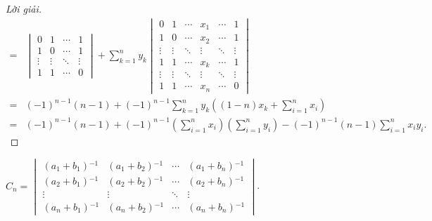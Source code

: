 \documentclass[class=nhvh-linear-algebra,crop=false]{standalone}
\begin{document}
\begin{proof}[Lời giải]
\begin{align*}
        = &
        \begin{vmatrix}
            0      & 1      & \cdots & 1      \\
            1      & 0      & \cdots & 1      \\
            \vdots & \vdots & \ddots & \vdots \\
            1      & 1      & \cdots & 0
        \end{vmatrix}
        +
        \sum^{n}_{k=1}y_{k}
        \begin{vmatrix}
            0      & 1      & \cdots & x_{1}  & \cdots & 1      \\
            1      & 0      & \cdots & x_{2}  & \cdots & 1      \\
            \vdots & \vdots & \ddots & \vdots & \ddots & \vdots \\
            1      & 1      & \cdots & x_{k}  & \cdots & 1      \\
            \vdots & \vdots & \ddots & \vdots & \ddots & \vdots \\
            1      & 1      & \cdots & x_{n}  & \cdots & 0
        \end{vmatrix}                                                                                               \\
        = &
        {(-1)}^{n-1}(n-1) + {(-1)}^{n-1}\sum^{n}_{k=1}y_{k}\left((1-n)x_{k} + \sum^{n}_{i=1}x_{i}\right)                                                  \\
        = & {(-1)}^{n-1}(n-1) + {(-1)}^{n-1}\left(\sum^{n}_{i=1}x_{i}\right)\left(\sum^{n}_{i=1}y_{i}\right) - {(-1)}^{n-1}(n-1)\sum^{n}_{i=1}x_{i}y_{i}.
    \end{align*}
    \endgroup{}
\end{proof}

\begin{exercise}
    $C_{n} = \begin{vmatrix}
            (a_{1} + b_{1}){}^{-1} & (a_{1} + b_{2}){}^{-1} & \cdots & (a_{1} + b_{n}){}^{-1} \\
            (a_{2} + b_{1}){}^{-1} & (a_{2} + b_{2}){}^{-1} & \cdots & (a_{2} + b_{n}){}^{-1} \\
            \vdots                 & \vdots                 & \ddots & \vdots                 \\
            (a_{n} + b_{1}){}^{-1} & (a_{n} + b_{2}){}^{-1} & \cdots & (a_{n} + b_{n}){}^{-1}
        \end{vmatrix}$.
\end{exercise}
\end{document}

